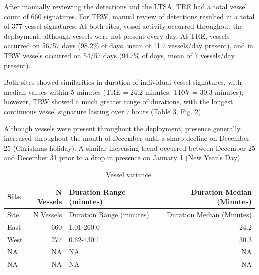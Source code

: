 \documentclass[
  letterpaper,
  oneside,
  open=any]{scrbook}
\begin{document}
After manually reviewing the detections and the LTSA, TRE had a total
vessel count of 660 signatures. For TRW, manual review of detections
resulted in a total of 377 vessel signatures. At both sites, vessel
activity occurred throughout the deployment, although vessels were not
present every day. At TRE, vessels occurred on 56/57 days (98.2\% of
days, mean of 11.7 vessels/day present), and in TRW vessels occurred on
54/57 days (94.7\% of days, mean of 7 vessels/day present).

Both sites showed similarities in duration of individual vessel
signatures, with median values within 5 minutes (TRE = 24.2 minutes; TRW
= 30.3 minutes); however, TRW showed a much greater range of durations,
with the longest continuous vessel signature lasting over 7 hours (Table
3, Fig. 2).

Although vessels were present throughout the deployment, presence
generally increased throughout the month of December until a sharp
decline on December 25 (Christmas holiday). A similar increasing trend
occurred between December 25 and December 31 prior to a drop in presence
on January 1 (New Year's Day).

\begin{longtable}[]{@{}lrlr@{}}
\caption{Vessel variance.}\tabularnewline
\toprule\noalign{}
Site & N Vessels & Duration Range (minutes) & Duration Median
(Minutes) \\
\midrule\noalign{}
\endfirsthead
\toprule\noalign{}
Site & N Vessels & Duration Range (minutes) & Duration Median
(Minutes) \\
\midrule\noalign{}
\endhead
\bottomrule\noalign{}
\endlastfoot
East & 660 & 1.01-260.0 & 24.2 \\
West & 277 & 0.62-430.1 & 30.3 \\
NA & NA & NA & NA \\
NA & NA & NA & NA \\
\end{longtable}
\end{document}
